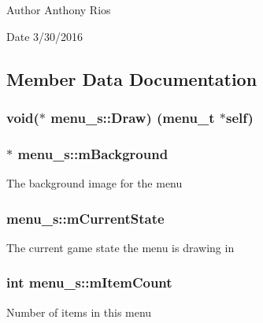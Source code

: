 \begin{DoxyAuthor}{Author}
Anthony Rios 
\end{DoxyAuthor}
\begin{DoxyDate}{Date}
3/30/2016 
\end{DoxyDate}


\subsection{Member Data Documentation}
\subsubsection[{\texorpdfstring{Draw}{Draw}}]{\setlength{\rightskip}{0pt plus 5cm}void($\ast$ menu\+\_\+s\+::\+Draw) ({\bf menu\+\_\+t} $\ast$self)}\hypertarget{structmenu__s_aa936a66917d20b02b67ac685d49c6eaf}{}\label{structmenu__s_aa936a66917d20b02b67ac685d49c6eaf}
\subsubsection[{\texorpdfstring{m\+Background}{mBackground}}]{$\ast$ menu\+\_\+s\+::m\+Background}\hypertarget{structmenu__s_a570575b24118365068e8cffbadff7186}{}\label{structmenu__s_a570575b24118365068e8cffbadff7186}
The background image for the menu 
\subsubsection[{\texorpdfstring{m\+Current\+State}{mCurrentState}}]{ menu\+\_\+s\+::m\+Current\+State}\hypertarget{structmenu__s_a6a6fc8c2b6fc9274e2d7275d8fd84f3d}{}\label{structmenu__s_a6a6fc8c2b6fc9274e2d7275d8fd84f3d}
The current game state the menu is drawing in 
\subsubsection[{\texorpdfstring{m\+Item\+Count}{mItemCount}}]{\setlength{\rightskip}{0pt plus 5cm}int menu\+\_\+s\+::m\+Item\+Count}\hypertarget{structmenu__s_a44d944be8c2648968407c31a0aef4494}{}\label{structmenu__s_a44d944be8c2648968407c31a0aef4494}
Number of items in this menu 

